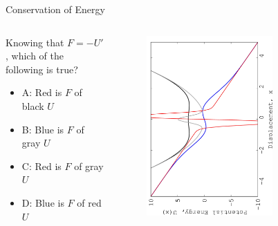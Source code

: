 \documentclass{beamer}
\begin{document}
\begin{frame}{Conservation of Energy}
\begin{columns}[T]
\begin{column}{0.3\textwidth}
\small
Knowing that $F = -U'$, which of the following is true?
\begin{itemize}
\item A: Red is $F$ of black $U$
\item B: Blue is $F$ of gray $U$
\item C: Red is $F$ of gray $U$
\item D: Blue is $F$ of red $U$
\end{itemize}
\end{column}
\begin{column}{0.7\textwidth}
\begin{figure}
\centering
\includegraphics[width=0.7\textwidth,angle=270]{figures/Nov14_plot4.jpg}
\end{figure}
\end{column}
\end{columns}
\end{frame}
\end{document}
